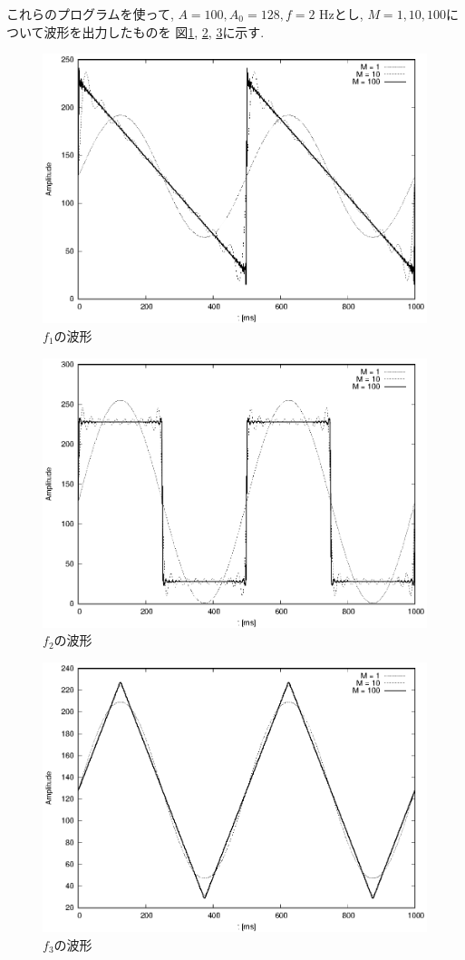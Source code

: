 \documentclass[titlepage]{jsarticle}
\begin{document}
    これらのプログラムを使って, $A = 100, A_0 = 128, f = 2$ Hzとし, $M = 1, 10, 100$について波形を出力したものを
    図\ref{fig:f1}, \ref{fig:f2}, \ref{fig:f3}に示す.

    \begin{figure}[h]
        \centering
        \includegraphics[width=0.8\hsize]{images/f1.eps}
        \caption{$f_1$の波形}
        \label{fig:f1}
    \end{figure}

    \begin{figure}[h]
        \centering
        \includegraphics[width=0.8\hsize]{images/f2.eps}
        \caption{$f_2$の波形}
        \label{fig:f2}
    \end{figure}

    \begin{figure}[h]
        \centering
        \includegraphics[width=0.8\hsize]{images/f3.eps}
        \caption{$f_3$の波形}
        \label{fig:f3}
    \end{figure}
\end{document}
